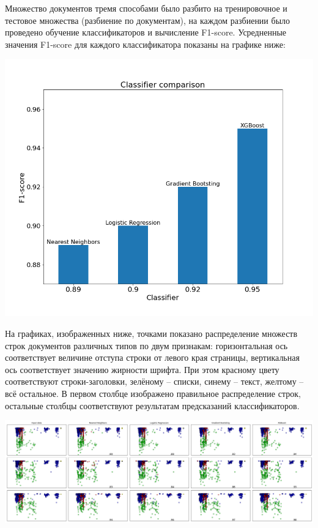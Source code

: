 \documentclass[a4paper,12pt]{article}
\begin{document}
Множество документов тремя способами было разбито на тренировочное и тестовое множества (разбиение по документам), на каждом разбиении было проведено обучение классификаторов и вычисление F1-score. Усредненные значения F1-score для каждого классификатора показаны на графике ниже:

\begin{center}
	\includegraphics[width=1.0\textwidth]{pics/scores.png}
\end{center}

На графиках, изображенных ниже, точками показано распределение множеств строк документов различных типов по двум признакам: горизонтальная ось соответствует величине отступа строки от левого края страницы, вертикальная ось соответствует значению жирности шрифта. При этом красному цвету соответствуют строки-заголовки, зелёному -- списки, синему -- текст, желтому -- всё остальное. В первом столбце изображено правильное распределение строк, остальные столбцы соответствуют результатам предсказаний классификаторов.

\begin{center}
	\includegraphics[width=1.0\textwidth]{pics/graphics.png}
\end{center}
\end{document}
